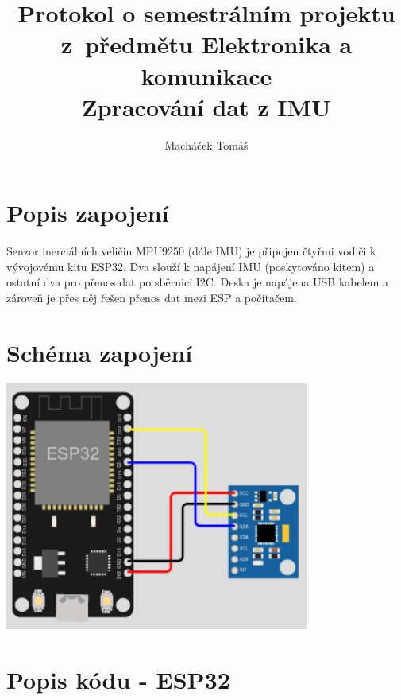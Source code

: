\documentclass{article}
\begin{document}
\title{\LARGE \textbf{Protokol o semestrálním projektu z předmětu Elektronika a komunikace}\\{\Large Zpracování dat z IMU}}
\author{Macháček Tomáš}

\maketitle

\vspace{2em}

\section{Popis zapojení}

Senzor inerciálních veličin MPU9250 (dále IMU) je připojen čtyřmi vodiči k vývojovému kitu ESP32. Dva slouží k napájení IMU (poskytováno kitem) a ostatní dva pro přenos dat po sběrnici I2C. Deska je napájena USB kabelem a zároveň je přes něj řešen přenos dat mezi ESP a počítačem.

\section{Schéma zapojení}

\begin{center}
    \includegraphics[width=10cm]{scheme.png}
\end{center}

\newpage

\section{Popis kódu - ESP32}

\lstset{language=C++}

\end{document}
